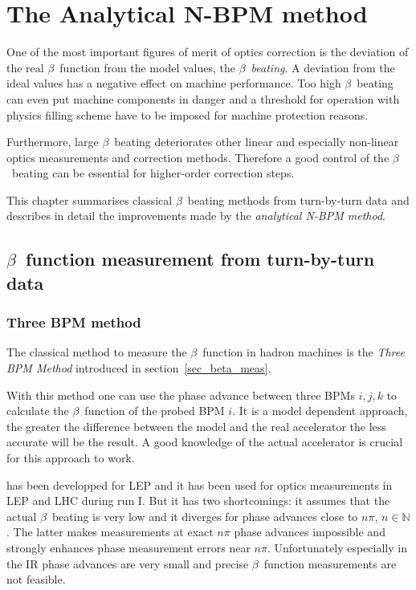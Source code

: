 \chapter{The Analytical N-BPM method}

\begin{chapterinfo}
One of the most important figures of merit of optics correction is the deviation of the real $\beta$~function
from the model values,
the $\beta$~\emph{beating}. A deviation from the ideal values has a negative effect on machine performance.
Too high $\beta$~beating can even put machine components in danger and a threshold for operation with
physics filling scheme have to be imposed for machine protection reasons.

Furthermore, large $\beta$~beating deteriorates other linear and especially non-linear optics measurements
and correction methods. Therefore a good control of the $\beta$~beating can be essential for higher-order
correction steps.

This chapter summarises classical $\beta$~beating methods from turn-by-turn data and describes in
detail the improvements made by the \emph{analytical N-BPM method}.
\end{chapterinfo}

\section{$\beta$~function measurement from turn-by-turn data}

\subsection{Three BPM method}

The classical method to measure the $\beta$~function in hadron machines is the \emph{Three BPM Method}
introduced in section~\ref{sec_beta_meas}.



With this method one can use the phase advance between three BPMs $i,j,k$ to calculate the $\beta$~function
of the probed BPM $i$. It is a model dependent approach, the greater the difference between the model
and the real accelerator the less accurate will be the result. A good knowledge of the actual accelerator
is crucial for this approach to work.

 has been developped for LEP and it has been used for optics measurements in LEP
and LHC during run I.
But it has two shortcomings: it assumes that the actual $\beta$~beating is very low and it
diverges for phase advances close to $n\pi$, $n \in \mathbb{N}$. The latter makes measurements at
exact $n\pi$ phase advances impossible and strongly enhances phase measurement errors near $n\pi$.
Unfortunately especially in the IR phase advances are very small and precise $\beta$~function measurements
are not feasible.

